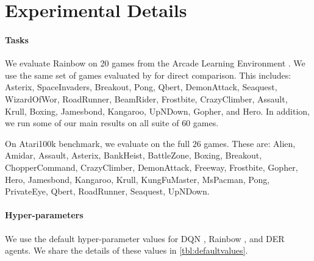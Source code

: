 \section{Experimental Details}
\label{appendix_sec:experimental_details}

\paragraph{Tasks} We evaluate Rainbow on 20 games from the Arcade Learning Environment \citep{bellemare2013arcade}. We use the same set of games evaluated by \citet{ceron2024mixtures} for direct comparison. This includes: Asterix, SpaceInvaders, Breakout, Pong, Qbert, DemonAttack, Seaquest, WizardOfWor, RoadRunner, BeamRider, Frostbite, CrazyClimber, Assault, Krull, Boxing, Jamesbond, Kangaroo, UpNDown, Gopher, and Hero.  In addition, we run some of our main results on all suite of $60$ games. 

On Atari100k benchmark, we evaluate on the full $26$ games. These are: Alien, Amidar, Assault, Asterix, BankHeist, BattleZone, Boxing, Breakout, ChopperCommand, CrazyClimber, DemonAttack, Freeway, Frostbite, Gopher, Hero, Jamesbond, Kangaroo, Krull, KungFuMaster, MsPacman, Pong, PrivateEye, Qbert, RoadRunner, Seaquest, UpNDown.


\paragraph{Hyper-parameters} We use the default hyper-parameter values for DQN \citep{mnih2015humanlevel}, Rainbow \citep{hessel2018rainbow}, and DER \citep{van2019use} agents. We share the details of these values in \autoref{tbl:defaultvalues}.

